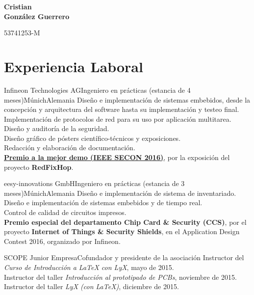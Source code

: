 \documentclass[11pt,a4paper,sans,spanish]{moderncv}
\begin{document}
\begin{minipage}[c]{\textwidth-110pt-0.2em}
    \begin{flushright}
        \textbf{\Huge{Cristian\\\vspace{4pt}González Guerrero}}

        \vspace{4pt}
        \small{53741253-M}
    \end{flushright}
\end{minipage}
\vspace{-5em}

\makecvtitle

\section{Experiencia Laboral}

{Infineon Technologies AG}{Ingeniero en prácticas (estancia de 4 meses)}{Múnich}{Alemania}
{Diseño e implementación de sistemas embebidos, desde la concepción y arquitectura del software hasta su implementación y testeo final.\\
Implementación de protocolos de red para su uso por aplicación multitarea.\\
Diseño y auditoría de la seguridad.\\
Diseño gráfico de pósters científico-técnicos y exposiciones.\\
Redacción y elaboración de documentación.\\
\href{http://secon2016.ieee-secon.org/content/demos-session}{\textbf{Premio a la mejor demo (IEEE SECON 2016)}}, por la exposición del proyecto \textbf{RedFixHop}.
}

{eesy-innovations GmbH}{Ingeniero en prácticas (estancia de 3 meses)}{Múnich}{Alemania}
{Diseño e implementación de sistema de inventariado.\\
Diseño e implementación de sistemas embebidos y de tiempo real.\\
Control de calidad de circuitos impresos.\\
\textbf{Premio especial del departamento Chip Card \& Security (CCS)}, por el proyecto \textbf{Internet of Things \& Security Shields}, en el Application Design Contest 2016, organizado por Infineon.}

{SCOPE Junior Empresa}{Cofundador y presidente de la asociación}{}{}
{Instructor del \emph{Curso de Introducción a LaTeX con LyX}, mayo de 2015.\\
Instructor del taller \emph{Introducción al prototipado de PCBs}, noviembre de 2015.\\
Instructor del taller \emph{LyX (con LaTeX)}, diciembre de 2015.
}
\end{document}
